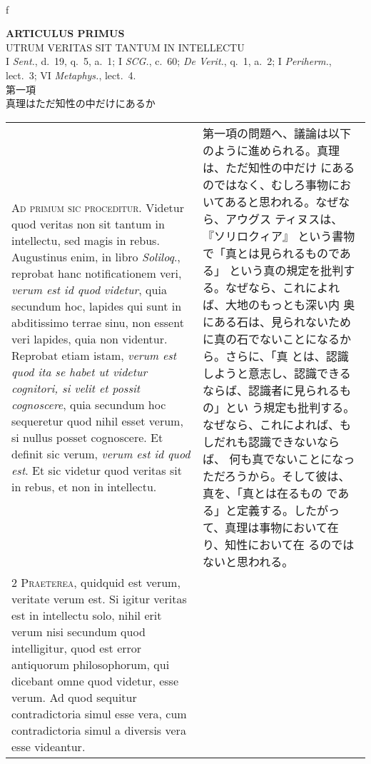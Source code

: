 \\f\documentclass[10pt]{jsarticle} %
\begin{document}
\begin{center}
 {\Large {\bf ARTICULUS PRIMUS}}\\
 {\large UTRUM VERITAS SIT TANTUM IN INTELLECTU}\\
 {\footnotesize I {\itshape Sent.}, d.~19, q.~5, a.~1; I {\itshape
 SCG.}, c.~60; {\itshape De Verit.}, q.~1, a.~2; I {\itshape Periherm.},
 lect.~3; VI {\itshape Metaphys.}, lect.~4.}\\
 {\Large 第一項\\真理はただ知性の中だけにあるか}
\end{center}

\begin{longtable}{p{21em}p{21em}}



{\huge A}{\scshape d primum sic proceditur}. Videtur quod veritas non
sit tantum in intellectu, sed magis in rebus. Augustinus enim, in
libro {\itshape Soliloq}., reprobat hanc notificationem veri,
{\itshape verum est id quod videtur}, quia secundum hoc, lapides qui
sunt in abditissimo terrae sinu, non essent veri lapides, quia non
videntur. Reprobat etiam istam, {\itshape verum est quod ita se habet
ut videtur cognitori, si velit et possit cognoscere}, quia secundum
hoc sequeretur quod nihil esset verum, si nullus posset cognoscere. Et
definit sic verum, {\itshape verum est id quod est}. Et sic videtur
quod veritas sit in rebus, et non in intellectu.

&

第一項の問題へ、議論は以下のように進められる。真理は、ただ知性の中だけ
にあるのではなく、むしろ事物においてあると思われる。なぜなら、アウグス
ティヌスは、『ソリロクィア』 という書物で「真とは見られるものである」
という真の規定を批判する。なぜなら、これによれば、大地のもっとも深い内
奥にある石は、見られないために真の石でないことになるから。さらに、「真
とは、認識しようと意志し、認識できるならば、認識者に見られるもの」とい
う規定も批判する。なぜなら、これによれば、もしだれも認識できないならば、
何も真でないことになっただろうから。そして彼は、真を、「真とは在るもの
である」と定義する。したがって、真理は事物において在り、知性において在
るのではないと思われる。

\\


{\scshape 2 Praeterea}, quidquid est verum, veritate verum est. Si
igitur veritas est in intellectu solo, nihil erit verum nisi secundum
quod intelligitur, quod est error antiquorum philosophorum, qui
dicebant omne quod videtur, esse verum. Ad quod sequitur
contradictoria simul esse vera, cum contradictoria simul a diversis
vera esse videantur.



\end{longtable}
\end{document}
